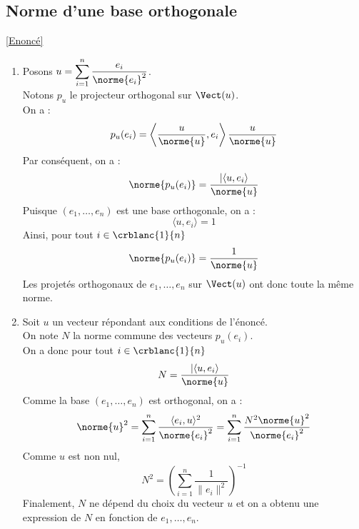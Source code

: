 \documentclass[8pt]{book}
\begin{document}
	\subsection{Norme d'une base orthogonale }
	\label{Norme d'une base orthogonale corrigé}
	\textcolor{blue}{\hyperref[Norme d'une base orthogonale]{[Enoncé]}}\\
	\begin{enumerate}[leftmargin=*]
		\item Posons $\displaystyle u=\sum_{i=1}^{n}\frac{e_i}{\norme{e_i}^2}$.\\
		Notons $p_u$ le projecteur orthogonal sur $\Vect(u)$.\\
		On a : \[p_u(e_i)=\left\langle \frac{u}{\norme{u}}, e_i\right\rangle\frac{u}{\norme{u}}\]
		Par conséquent, on a : 
		\[\norme{p_u(e_i)}=\frac{|\langle u,e_i\rangle}{\norme{u}}\]
		Puisque $(e_1,\dots,e_n)$ est une base orthogonale, on a :
		\[\langle u,e_i\rangle=1\]
		Ainsi, pour tout $i\in\crblanc{1}{n}$ \[\norme{p_u(e_i)}=\frac{1}{\norme{u}}\]
		Les projetés orthogonaux de $e_1,\dots, e_n$ sur $\Vect(u)$ ont donc toute la même norme.
		\item Soit $u$ un vecteur répondant aux conditions de l'énoncé.\\
		On note $N$ la norme commune des vecteurs $p_u(e_i)$.\\
		On a donc pour tout $i\in\crblanc{1}{n}$ \[N=\frac{|\langle u,e_i\rangle}{\norme{u}}\]
		Comme la base $(e_1,\dots,e_n)$ est orthogonal, on a :
		\[\norme{u}^2=\sum_{i=1}^{n}\frac{\langle e_i,u\rangle^2}{\norme{e_i}^2}=\sum_{i=1}^{n}\frac{N^2\norme{u}^2}{\norme{e_i}^2}\]
		Comme $u$ est non nul, 
		\[N^2 = \left(\sum_{i=1}^{n}\frac{1}{\|e_i\|^2}\right)^{-1}\]
		Finalement, $N$ ne dépend du choix du vecteur $u$ et on a obtenu une expression de $N$ en fonction de $e_1,\dots, e_n$.
	\end{enumerate}
	
\end{document}

